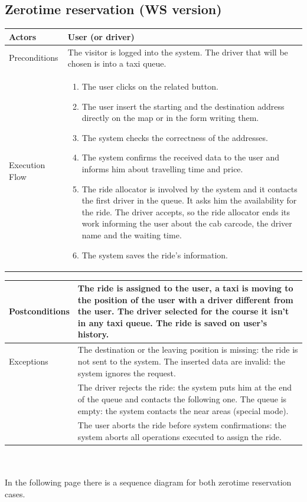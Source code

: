 \subsection{Zerotime reservation (WS version)}
\begin{tabular}{lp{8cm}}
	\hline 
	Actors & User (or \Gls{driver})  \\ \hline
	Preconditions & The visitor is logged into the system. The driver that will be chosen is into a taxi queue.  \\ \hline
	Execution Flow &  \begin{enumerate}
					\item The user clicks on the related button.
					\item The user insert the starting and the destination address directly on the \gls{map} or in the form writing them.
					\item The system checks the correctness of the addresses.
					\item The system confirms the received data to the user and informs him about travelling time and price.
					\item The ride allocator is involved by the system and it contacts the first driver in the queue. It asks him the availability for the ride. The driver accepts, so the ride allocator ends its work informing the user about the cab carcode, the driver name and the waiting time.
					\item The system saves the ride's information.
				\end{enumerate}
\\ \hline
\end{tabular}
\newpage
\begin{tabular}{lp{8cm}}
	\hline	 
	 Postconditions & The ride is assigned to the user, a taxi is moving to the position of the user with a driver different from the user. The driver selected for the course it isn't in any taxi queue. The ride is saved on user's history. \\ \hline
	 Exceptions &  The destination or the leaving position is missing: the ride is not sent to the system. The inserted data are invalid: the system ignores the request.\\
& The driver rejects the ride: the system puts him at the end of the queue and contacts the following one. The queue is empty: the system contacts the near areas (special mode).\\
& The user aborts the ride before system confirmations: the system aborts all operations executed to assign the ride.
\\ \hline
\end{tabular}
\\
\\
In the following page there is a sequence diagram for both zerotime \gls{reservation} cases.\\

